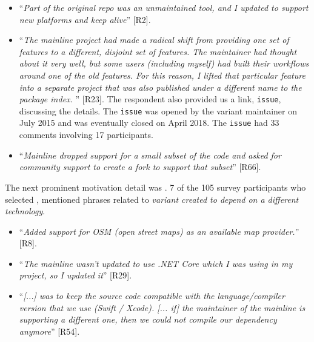 \begin{itemize}[leftmargin=*]
\item ``\emph{Part of the original repo was an unmaintained tool, and I updated to support new platforms and keep alive}'' [R2].
\item ``\emph{The mainline project had made a radical shift from providing one set of features %
to a different, disjoint set of features. %
The maintainer had thought about it very well, but some users (including myself) had built their workflows around one of the old features. For this reason, I lifted that particular feature into a separate project that was also published under a different name to the package index.%
}'' [R23]. The respondent also provided us a link, \gh \texttt{issue}, discussing the details. The \texttt{issue} was opened by the variant maintainer on July 2015 and was eventually closed on April 2018. The \texttt{issue} had 33 comments involving 17 participants. %

\item ``\textit{Mainline dropped support for a small subset of the code and asked for community support to create a fork to support that subset}'' [R66].
\end{itemize}

\nd The next prominent  motivation detail was .
7 of the 105 survey participants who selected , mentioned phrases related to \emph{variant created to depend on a different technology}.

\begin{itemize}[leftmargin=*]
\item ``\emph{Added support for OSM (open street maps) as an available map provider.}'' [R8].
\item ``\emph{The mainline wasn't updated to use .NET Core which I was using in my project, so I updated it}'' [R29].
\item ``\emph{[...] was to keep the source code compatible with the language/compiler version that we use (Swift / Xcode). [... if] %
the maintainer of the mainline is supporting a different one, then we could not compile our dependency anymore}'' [R54].
\end{itemize}


